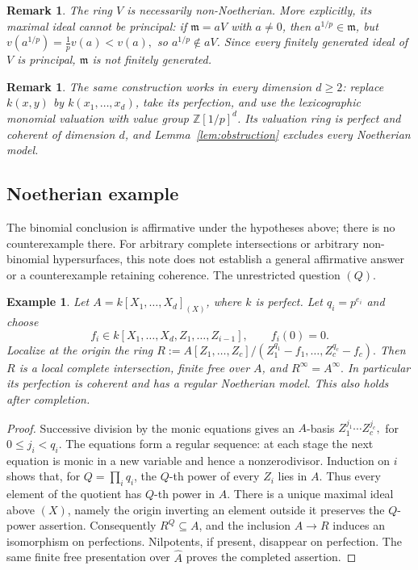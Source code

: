 \documentclass[11pt,a4paper]{amsart}
\numberwithin{equation}{section}
\newtheorem{example}[theorem]{Example}\newtheorem{notation}[theorem]{Notation}
\newtheorem{remark}[theorem]{Remark}
\newcommand{\ZZ}{\mathbb Z}
\begin{document}
 \begin{remark}	The ring $V$ is necessarily non-Noetherian. More explicitly, its	maximal ideal cannot be principal: if $\mathfrak m=aV$ with	$a\neq0$, then $a^{1/p}\in\mathfrak m$, but	$	v(a^{1/p})=\frac{1}{p}v(a)<v(a), $	so $a^{1/p}\notin aV$. Since every finitely generated ideal of $V$	is principal, $\mathfrak m$ is not finitely generated.
 \end{remark}
 
 \begin{remark} 	The same construction works in every dimension $d\geq2$:	replace $k(x,y)$ by $k(x_1,\ldots,x_d)$, take its perfection,	and use the lexicographic monomial valuation with value group	$\ZZ[1/p]^d$.	Its valuation ring is perfect and coherent of dimension $d$,	and Lemma~\ref{lem:obstruction} excludes every Noetherian model.
 \end{remark}
 
 \subsection{Noetherian example}
 
 
 The binomial conclusion is affirmative under the hypotheses above;
 there is no counterexample there. For arbitrary complete
 intersections or arbitrary non-binomial hypersurfaces, this note
 does not establish a general affirmative answer or a counterexample
 retaining coherence. The unrestricted question $(Q)$.

 
 \begin{example}\label{prop:tower}	Let $A=k[X_1,\ldots,X_d]_{(X)}$, where $k$ is perfect.	Let $q_i=p^{e_i}$ and choose	$$f_i\in k[X_1,\ldots,X_d,Z_1,\ldots,Z_{i-1}], 	\qquad f_i(0)=0. $$
Localize at the origin the ring
$R:= 	A[Z_1,\ldots,Z_c]/ 	(Z_1^{q_1}-f_1,\ldots,Z_c^{q_c}-f_c).$ 	Then $R$ is a local complete intersection, finite free over $A$, 	and
 $R^\infty=A^\infty.$	In particular its perfection is coherent and has a regular 	Noetherian model. This also holds after completion.
 \end{example}
 
 \begin{proof}	Successive division by the monic equations gives an $A$-basis	$	Z_1^{j_1}\cdots Z_c^{j_c},$ for $ 0\leq j_i<q_i.$	The equations form a regular sequence: at each stage the next	equation is monic in a new variable and hence a nonzerodivisor.	Induction on $i$ shows that, for	$Q=\prod_iq_i$, the $Q$-th power of every $Z_i$ lies in $A$.	Thus every element of the quotient has $Q$-th power in $A$.	There is a unique maximal ideal above $(X)$, namely the origin	inverting an element outside it preserves the $Q$-power assertion.	Consequently $R^Q\subseteq A$, and the inclusion $A\to R$	induces an isomorphism on perfections. Nilpotents, if present,	disappear on perfection.	The same finite free presentation over $\widehat A$ proves the	completed assertion.
 \end{proof}
 
\end{document}
